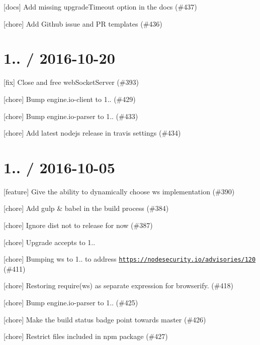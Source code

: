 \begin{DoxyItemize}
\item \mbox{[}docs\mbox{]} Add missing {\ttfamily upgrade\+Timeout} option in the docs (\#437)
\item \mbox{[}chore\mbox{]} Add Github issue and PR templates (\#436)
\end{DoxyItemize}

\section*{1.. / 2016-\/10-\/20 }


\begin{DoxyItemize}
\item \mbox{[}fix\mbox{]} Close and free web\+Socket\+Server (\#393)
\item \mbox{[}chore\mbox{]} Bump engine.\+io-\/client to 1.. (\#429)
\item \mbox{[}chore\mbox{]} Bump engine.\+io-\/parser to 1.. (\#433)
\item \mbox{[}chore\mbox{]} Add latest nodejs release in travis settings (\#434)
\end{DoxyItemize}

\section*{1.. / 2016-\/10-\/05 }


\begin{DoxyItemize}
\item \mbox{[}feature\mbox{]} Give the ability to dynamically choose ws implementation (\#390)
\item \mbox{[}chore\mbox{]} Add gulp \& babel in the build process (\#384)
\item \mbox{[}chore\mbox{]} Ignore dist not to release for now (\#387)
\item \mbox{[}chore\mbox{]} Upgrade accepts to 1..
\item \mbox{[}chore\mbox{]} Bumping ws to 1.. to address \href{https://nodesecurity.io/advisories/120}{\tt https\+://nodesecurity.\+io/advisories/120} (\#411)
\item \mbox{[}chore\mbox{]} Restoring require(\textquotesingle{}ws\textquotesingle{}) as separate expression for browserify. (\#418)
\item \mbox{[}chore\mbox{]} Bump engine.\+io-\/parser to 1.. (\#425)
\item \mbox{[}chore\mbox{]} Make the build status badge point towards master (\#426)
\item \mbox{[}chore\mbox{]} Restrict files included in npm package (\#427)
\end{DoxyItemize}

